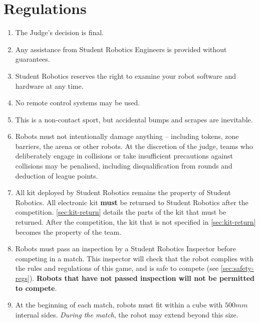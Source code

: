 \section {Regulations}
\label{sec:Regulations}

\begin{enumerate}


\item The Judge's decision is final.
\item Any assistance from Student Robotics Engineers is provided without guarantees.
\item Student Robotics reserves the right to examine your robot software and hardware at any time.


\item No remote control systems may be used.
\item This is a non-contact sport, but accidental bumps and scrapes are inevitable.
\item Robots must not intentionally damage anything -- including tokens, zone barriers, the arena or other robots.
      At the discretion of the judge, teams who deliberately engage in collisions or take insufficient precautions against collisions may be penalised, including disqualification from rounds and deduction of league points.
\item All kit deployed by Student Robotics remains the property of Student Robotics.
      All electronic kit \textbf{must} be returned to Student Robotics after the competition.
      \autoref{sec:kit-return} details the parts of the kit that must be returned.
      After the competition, the kit that is not specified in \autoref{sec:kit-return} becomes the property of the team.


\item Robots must pass an inspection by a Student Robotics Inspector before competing in a match.
      This inspector will check that the robot complies with the rules and regulations of this game, and is safe to compete (see \autoref{sec:safety-regs}).
      \textbf{Robots that have not passed inspection will not be permitted to compete}.

\item At the beginning of each match, robots must fit within a cube with $500mm$ internal sides.
      \textit{During the match}, the robot may extend beyond this size.


\end{enumerate}
